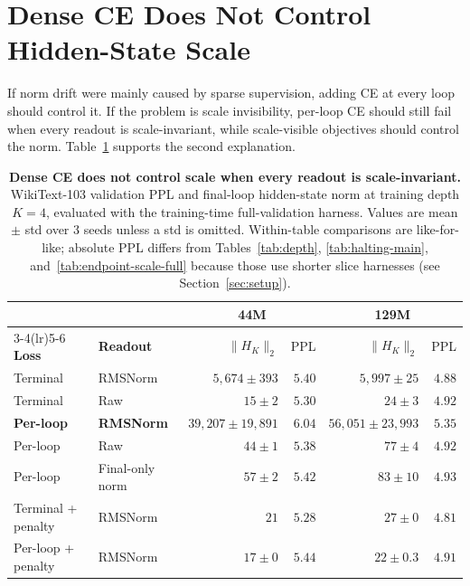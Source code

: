 \section{Dense CE Does Not Control Hidden-State Scale}
\label{sec:drift}

If norm drift were mainly caused by sparse supervision, adding CE at every loop should control it.
If the problem is scale invisibility, per-loop CE should still fail when every readout is scale-invariant, while scale-visible objectives should control the norm.
Table~\ref{tab:main} supports the second explanation.

\begin{table}[t]
\centering
\small
\caption{\textbf{Dense CE does not control scale when every readout is scale-invariant.} WikiText-103 validation PPL and final-loop hidden-state norm at training depth $K=4$, evaluated with the training-time full-validation harness. Values are mean $\pm$ std over 3 seeds unless a std is omitted. Within-table comparisons are like-for-like; absolute PPL differs from Tables~\ref{tab:depth}, \ref{tab:halting-main}, and~\ref{tab:endpoint-scale-full} because those use shorter slice harnesses (see Section~\ref{sec:setup}).}
\label{tab:main}
\begin{tabular}{llrrrr}
\toprule
 & & \multicolumn{2}{c}{44M} & \multicolumn{2}{c}{129M} \\
\cmidrule(lr){3-4}\cmidrule(lr){5-6}
\textbf{Loss} & \textbf{Readout} & $\|H_K\|_2$ & PPL & $\|H_K\|_2$ & PPL \\
\midrule
Terminal & RMSNorm & $5{,}674{\pm}393$ & $5.40$ & $5{,}997{\pm}25$ & $4.88$ \\
Terminal & Raw & $15{\pm}2$ & $5.30$ & $24{\pm}3$ & $4.92$ \\
\textbf{Per-loop} & \textbf{RMSNorm} & {\boldmath$39{,}207{\pm}19{,}891$} & $6.04$ & {\boldmath$56{,}051{\pm}23{,}993$} & $5.35$ \\
Per-loop & Raw & $44{\pm}1$ & $5.38$ & $77{\pm}4$ & $4.92$ \\
Per-loop & Final-only norm & $57{\pm}2$ & $5.42$ & $83{\pm}10$ & $4.93$ \\
Terminal + penalty & RMSNorm & $21$ & $5.28$ & $27{\pm}0$ & $4.81$ \\
Per-loop + penalty & RMSNorm & $17{\pm}0$ & $5.44$ & $22{\pm}0.3$ & $4.91$ \\
\bottomrule
\end{tabular}
\end{table}

